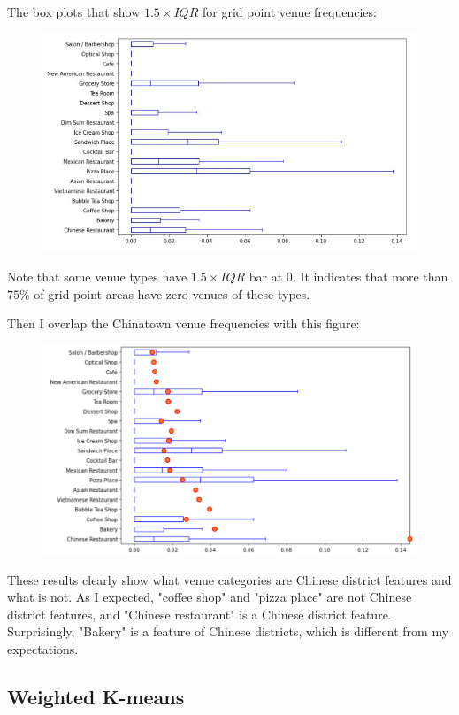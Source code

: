 \documentclass{article}
\begin{document}
The box plots that show $1.5 \times IQR$ for grid point venue frequencies:
\begin{figure}[h!]
\includegraphics[width=1.0\textwidth]{cn2.jpg}
\centering
\end{figure}
Note that some venue types have $1.5 \times IQR$ bar at 0. It indicates that more than $75\%$ of grid point areas have zero venues of these types.

Then I overlap the Chinatown venue frequencies with this figure:
\begin{figure}[h!]
\includegraphics[width=1.0\textwidth]{cn3.pdf}
\centering
\end{figure}
These results clearly show what venue categories are Chinese district features and what is not.
As I expected, "coffee shop" and "pizza place" are not Chinese district features, and "Chinese restaurant" is a Chinese district feature.
Surprisingly, "Bakery" is a feature of Chinese districts, which is different from my expectations.

\newpage

\subsection{Weighted K-means}
\end{document}
